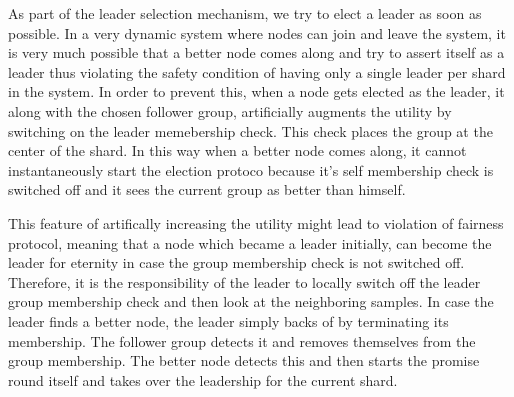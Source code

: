 \documentclass[12pt,a4paper,twoside,openright]{book}
\begin{document}
As part of the leader selection mechanism, we try to elect a leader as soon as possible. In a very dynamic system where nodes can join and leave the system, it is very much possible that a better node comes along and try to assert itself as a leader thus violating the safety condition of having only a single leader per shard in the system. In order to prevent this, when a node gets elected as the leader, it along with the chosen follower group, artificially augments the utility by switching on the leader memebership check. This check places the group at the center of the shard. In this way when a better node comes along, it cannot instantaneously start the election protoco because it's self membership check is switched off and it sees the current group as better than himself. 

\par This feature of artifically increasing the utility might lead to violation of fairness protocol, meaning that a node which became a leader initially, can become the leader for eternity in case the group membership check is not switched off. Therefore, it is the responsibility of the leader to locally switch off the leader group membership check and then look at the neighboring samples. In case the leader finds a better node, the leader simply backs of by terminating its membership. The follower group detects it and removes themselves from the group membership. The better node detects this and then starts the promise round itself and takes over the leadership for the current shard.
\end{document}
